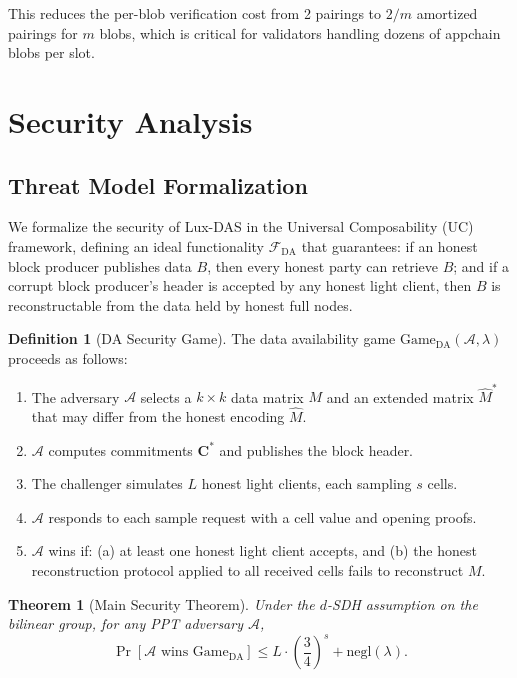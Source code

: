 \documentclass[11pt,a4paper]{article}
\theoremstyle{plain}
\newtheorem{theorem}{Theorem}[section]
\theoremstyle{definition}
\newtheorem{definition}{Definition}[section]
\theoremstyle{remark}
\begin{document}
This reduces the per-blob verification cost from 2 pairings to $2/m$ amortized pairings
for $m$ blobs, which is critical for validators handling dozens of appchain blobs per slot.


\section{Security Analysis}
\label{sec:security}

\subsection{Threat Model Formalization}

We formalize the security of Lux-DAS in the Universal Composability (UC) framework,
defining an ideal functionality $\mathcal{F}_{\text{DA}}$ that guarantees: if an honest
block producer publishes data $B$, then every honest party can retrieve $B$; and if a
corrupt block producer's header is accepted by any honest light client, then $B$ is
reconstructable from the data held by honest full nodes.

\begin{definition}[DA Security Game]
\label{def:da-game}
The data availability game $\text{Game}_{\text{DA}}(\mathcal{A}, \lambda)$ proceeds as follows:
\begin{enumerate}
    \item The adversary $\mathcal{A}$ selects a $k \times k$ data matrix $M$ and an extended
          matrix $\hat{M}^*$ that may differ from the honest encoding $\hat{M}$.
    \item $\mathcal{A}$ computes commitments $\mathbf{C}^*$ and publishes the block header.
    \item The challenger simulates $L$ honest light clients, each sampling $s$ cells.
    \item $\mathcal{A}$ responds to each sample request with a cell value and opening proofs.
    \item $\mathcal{A}$ wins if: (a) at least one honest light client accepts, and
          (b) the honest reconstruction protocol applied to all received cells fails to
          reconstruct $M$.
\end{enumerate}
\end{definition}

\begin{theorem}[Main Security Theorem]
\label{thm:main-security}
Under the $d$-SDH assumption on the bilinear group, for any PPT adversary $\mathcal{A}$,
\[
    \Pr[\mathcal{A} \text{ wins } \text{Game}_{\text{DA}}] \leq L \cdot \left(\frac{3}{4}\right)^s + \text{negl}(\lambda).
\]
\end{theorem}
\end{document}
